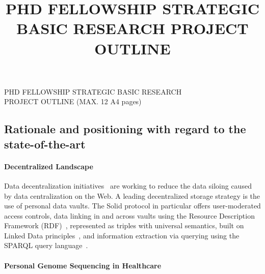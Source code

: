 \documentclass[a4paper,11pt]{article}
\begin{document}
\begin{mdframed}[backgroundcolor=black!17,linecolor=black!0,font=\bfseries]
	\centering
	PHD FELLOWSHIP STRATEGIC BASIC RESEARCH\\
	PROJECT OUTLINE (MAX. 12 A4 pages)\\
	\end{mdframed}
	\vspace{-.5\baselineskip}
\title{PHD FELLOWSHIP STRATEGIC BASIC RESEARCH PROJECT OUTLINE}

\begin{refsection}

\section{Rationale and positioning with regard to the state-of-the-art}

\smallskip

\paragraph{Decentralized Landscape}
Data decentralization initiatives~\cite{solid, mastodon, decentralizednanopubs} are working to reduce the data siloing caused by data centralization on the Web.
A leading decentralized storage strategy is the use of personal data vaults.
The Solid protocol in particular offers user-moderated access controls, data linking in and across vaults using the Resource Description Framework (RDF)~\cite{spec:rdf}, represented as triples with universal semantics, built on Linked Data principles~\cite{linkeddata}, and information extraction via querying using the SPARQL query language~\cite{spec:sparqllang}.




\paragraph{Personal Genome Sequencing in Healthcare}


\end{refsection}
\end{document}
